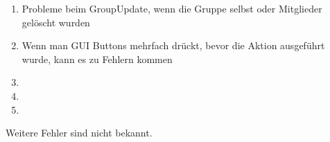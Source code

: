 \begin{enumerate}
	\item Probleme beim GroupUpdate, wenn die Gruppe selbst oder Mitglieder gelöscht wurden
	\item Wenn man GUI Buttons mehrfach drückt, bevor die Aktion ausgeführt wurde, kann es zu Fehlern kommen
	\item
	\item
	\item
\end{enumerate}

Weitere Fehler sind nicht bekannt.